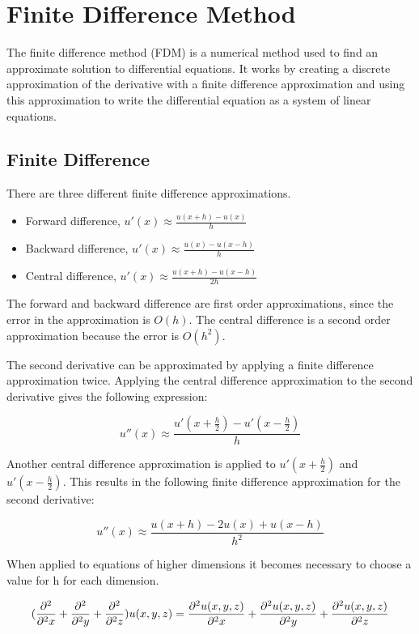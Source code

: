 \section{Finite Difference Method}

The finite difference method (FDM) is a numerical method used to find an approximate 
solution to differential equations. It works by creating a discrete approximation 
of the derivative with a finite difference approximation and using this approximation
to write the differential equation as a system of linear equations.

\subsection{Finite Difference}

There are three different finite difference approximations.

\begin{itemize}
	\item Forward difference, $u'(x) \approx \frac{u(x+h) - u(x)}{h}$
	\item Backward difference, $u'(x) \approx \frac{u(x) - u(x - h)}{h}$
	\item Central difference, $u'(x) \approx \frac{u(x + h) - u(x - h)}{2h}$
\end{itemize}

The forward and backward difference are first order approximations, since the
error in the approximation is $O(h)$. The central difference is a second order
approximation because the error is $O(h^2)$.

The second derivative can be approximated by applying a finite difference
approximation twice. Applying the central difference approximation to the second
derivative gives the following expression:

$$ u''(x) \approx \frac{u'(x + \frac{h}{2}) - u'(x - \frac{h}{2})}{h} $$

Another central difference approximation is applied to $u'(x + \frac{h}{2})$ and
$u'(x - \frac{h}{2})$. This results in the following finite difference
approximation for the second derivative:

$$u''(x) \approx \frac{u(x+h) - 2u(x) + u(x-h)}{h^2}$$

When applied to equations of higher dimensions it becomes necessary to choose a
value for h for each dimension.

$$(\frac{\partial^2}{\partial^2 x} + \frac{\partial^2}{\partial^2 y} + \frac{\partial^2}{\partial^2 z}) u(x, y, z) = \frac{\partial^2 u(x, y, z)}{\partial^2 x} 
+ \frac{\partial^2 u(x, y, z)}{\partial^2 y} + \frac{\partial^2 u(x, y, z)}{\partial^2 z}$$

